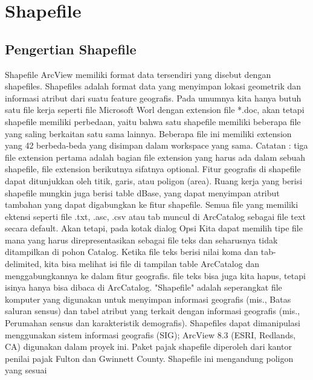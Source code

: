 

\section{Shapefile}
\subsection{Pengertian Shapefile}
Shapefile ArcView memiliki format data tersendiri yang disebut dengan shapefiles. 
Shapefiles adalah format data yang menyimpan lokasi geometrik dan informasi atribut dari suatu feature geografis. 
Pada umumnya kita hanya butuh satu file kerja seperti file Microsoft Worl dengan extension file *.doc, 
akan tetapi shapefile memiliki perbedaan, yaitu bahwa satu shapefile memiliki beberapa file yang saling berkaitan satu sama lainnya. 
Beberapa file ini memiliki extension yang 42 berbeda-beda yang disimpan dalam workspace yang sama.
Catatan : tiga file extension pertama adalah bagian file extension yang harus ada dalam sebuah shapefile, file extension berikutnya sifatnya optional.
Fitur geografis di shapefile dapat ditunjukkan oleh titik, garis, atau poligon (area). Ruang kerja yang berisi shapefile
mungkin juga berisi table dBase, yang dapat menyimpan atribut tambahan yang dapat digabungkan ke fitur shapefile.
Semua file yang memiliki ektensi seperti file .txt, .asc, .csv atau tab muncul di ArcCatalog sebagai file text secara default.
Akan tetapi, pada kotak dialog Opsi Kita dapat memilih tipe file mana yang harus direpresentasikan sebagai file
teks dan seharusnya tidak ditampilkan di pohon Catalog. Ketika file teks berisi nilai koma dan tab-delimited,
kita bisa melihat isi file di tampilan table ArcCatalog dan menggabungkannya ke dalam fitur geografis. file teks bisa juga kita hapus, tetapi isinya hanya bisa dibaca di ArcCatalog.\cite{kennedy2013introducing}
"Shapefile" adalah seperangkat file komputer yang digunakan untuk menyimpan informasi geografis (mis., Batas saluran sensus) 
dan tabel atribut yang terkait dengan informasi geografis (mis., Perumahan sensus dan karakteristik demografis). Shapefiles dapat 
dimanipulasi menggunakan sistem informasi geografis (SIG); ArcView 8.3 (ESRI, Redlands, CA) digunakan dalam proyek ini. 
Paket pajak shapefile diperoleh dari kantor penilai pajak Fulton dan Gwinnett County. Shapefile ini mengandung poligon yang sesuai 
